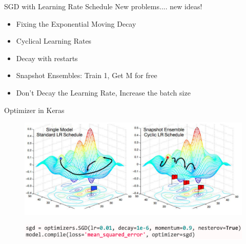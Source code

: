 \documentclass[xcolor=pdftex,dvipsnames,table,mathserif]{beamer}
\begin{document}
\begin{frame}{SGD with Learning Rate Schedule}
New problems.... new ideas!
\begin{itemize}
\item Fixing the Exponential Moving Decay \cite{dozat2016deep}
\item Cyclical Learning Rates \cite{smith2017cyclical}
\item Decay with restarts  \cite{loshchilov2016sgdr}
\item Snapshot Ensembles: Train 1, Get M for free \cite{huang2017snapshot}
\item Don't Decay the Learning Rate, Increase the batch size \cite{smith2018don}
\end{itemize}
\end{frame}





\begin{frame}{Optimizer in Keras}
\begin{figure}
\includegraphics[width=.95\columnwidth]{../graphics/SnapshotCurve}
\caption{\cite{huang2017snapshot}}
\end{figure}
\begin{figure}
\includegraphics[width=.95\columnwidth]{../graphics/KerasSGD}
\end{figure}
\end{frame}
\end{document}

